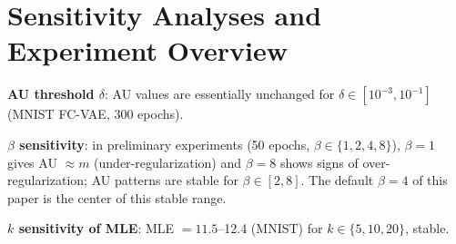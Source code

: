 \documentclass[make,article,submit,pdftex,moreauthors]{Definitions/mdpi}
\begin{document}
\section[\appendixname~\thesection]{Sensitivity Analyses and Experiment Overview}\label{app:sens}

\textbf{AU threshold $\delta$}: AU values are essentially unchanged for
$\delta \in [10^{-3}, 10^{-1}]$ (MNIST FC-VAE, 300 epochs).

\textbf{$\beta$ sensitivity}: in preliminary experiments (50 epochs,
$\beta \in \{1, 2, 4, 8\}$), $\beta = 1$ gives AU $\approx m$
(under-regularization) and $\beta = 8$ shows signs of over-regularization;
AU patterns are stable for $\beta \in [2, 8]$.
The default $\beta = 4$ of this paper is the center of this stable range.

\textbf{$k$ sensitivity of MLE}: MLE $= 11.5$--12.4 (MNIST) for
$k \in \{5, 10, 20\}$, stable.
\end{document}
